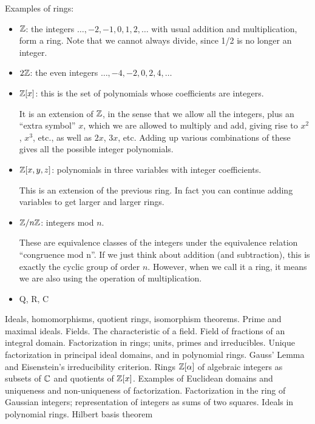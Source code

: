 Examples of rings:
\begin{itemize}
\item $\mathbb Z$: the integers $\dots,-2,-1,0,1,2,\dots$ with usual addition and multiplication, form a ring. Note that we cannot always divide, since 1/2 is no longer an integer.

\item $2\mathbb Z$: the even integers $\dots,-4,-2,0,2,4,\dots$

\item $\mathbb Z[x]$: this is the set of polynomials whose coefficients are integers. 

It is an extension of $\mathbb Z$, in the sense that we allow all the integers, plus an “extra symbol” $x$, which we are allowed to multiply and add, giving rise to $x^2$, $x^3$, etc., as well as $2x$, $3x$, etc. Adding up various combinations of these gives all the possible integer polynomials.

\item $\mathbb Z[x,y,z]$: polynomials in three variables with integer coefficients. 

This is an extension of the previous ring. In fact you can continue adding variables to get larger and larger rings.

\item $\mathbb Z/n\mathbb Z$: integers mod $n$. 

These are equivalence classes of the integers under the equivalence relation “congruence mod n”. If we just think about addition (and subtraction), this is exactly the cyclic group of order $n$. However, when we call it a ring, it means we are also using the operation of multiplication.

\item Q, R, C

\end{itemize}

Ideals, homomorphisms, quotient rings, isomorphism theorems. Prime and maximal ideals. Fields. The characteristic of a field. Field of fractions of an
integral domain.
Factorization in rings; units, primes and irreducibles. Unique factorization in principal ideal domains, and
in polynomial rings. Gauss’ Lemma and Eisenstein’s irreducibility criterion.
Rings $\mathbb Z[\alpha]$ of algebraic integers as subsets of $\mathbb C$ and quotients of $\mathbb Z[x]$. Examples of Euclidean domains and
uniqueness and non-uniqueness of factorization. Factorization in the ring of Gaussian integers; representation of integers as sums of two squares.
Ideals in polynomial rings. Hilbert basis theorem

